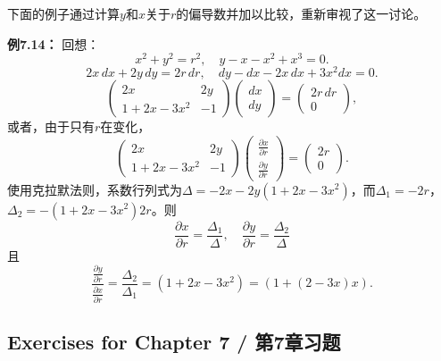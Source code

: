 \begin{translation}
下面的例子通过计算$y$和$x$关于$r$的偏导数并加以比较，重新审视了这一讨论。

\textbf{例7.14：} 回想：
\[
x^2 + y^2 = r^2, \quad y - x - x^2 + x^3 = 0.
\]
\[
2x\,dx + 2y\,dy = 2r\,dr, \quad dy - dx - 2x\,dx + 3x^2 dx = 0.
\]
\[
\begin{pmatrix} 2x & 2y \\ 1 + 2x - 3x^2 & -1 \end{pmatrix}
\begin{pmatrix} dx \\ dy \end{pmatrix}
= \begin{pmatrix} 2r\,dr \\ 0 \end{pmatrix},
\]
或者，由于只有$r$在变化，
\[
\begin{pmatrix} 2x & 2y \\ 1 + 2x - 3x^2 & -1 \end{pmatrix}
\begin{pmatrix} \frac{\partial x}{\partial r} \\[2pt] \frac{\partial y}{\partial r} \end{pmatrix}
= \begin{pmatrix} 2r \\ 0 \end{pmatrix}.
\]
使用克拉默法则，系数行列式为$\Delta = -2x - 2y(1 + 2x - 3x^2)$，而$\Delta_1 = -2r$，$\Delta_2 = -(1 + 2x - 3x^2)2r$。则
\[
\frac{\partial x}{\partial r} = \frac{\Delta_1}{\Delta}, \quad \frac{\partial y}{\partial r} = \frac{\Delta_2}{\Delta}
\]
且
\[
\frac{\frac{\partial y}{\partial r}}{\frac{\partial x}{\partial r}} = \frac{\Delta_2}{\Delta_1} = (1 + 2x - 3x^2) = (1 + (2 - 3x)x).
\]
\end{translation}


\subsection*{Exercises for Chapter 7 / 第7章习题}

